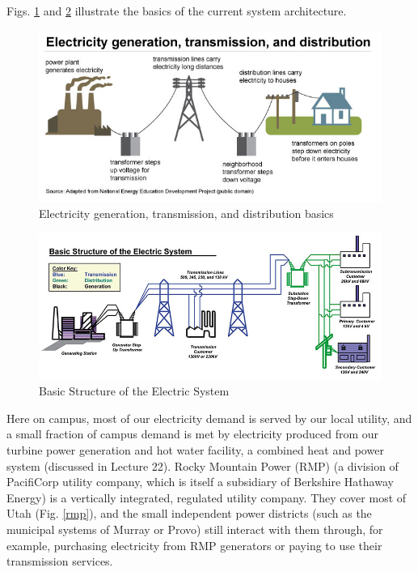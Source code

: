 \documentclass[10pt]{article}
\begin{document}
Figs. \ref{eiaill} and \ref{ucsill} illustrate the basics of the current system architecture.

\medskip
            \begin{figure}[h]
            \centering
            \includegraphics[width=12cm]{extras21/transmission.jpg}
            \caption{Electricity generation, transmission, and distribution basics \cite{howelectricity}}
            \label{eiaill}
            \end{figure}
\bigskip

\medskip
            \begin{figure}[h]
            \centering
            \includegraphics[width=12cm]{extras21/ucsill.jpg}
            \caption{Basic Structure of the Electric System \cite{howtheelectricity}}
            \label{ucsill}
            \end{figure}
\bigskip

Here on campus, most of our electricity demand is served by our local utility, and a small fraction of campus demand is met by electricity produced from our turbine power generation and hot water facility, a combined heat and power system (discussed in Lecture 22). Rocky Mountain Power (RMP) (a division of PacifiCorp utility company, which is itself a subsidiary of Berkshire Hathaway Energy) is a vertically integrated, regulated \cite{noauthor_undated-eo} utility company. %
They cover most of Utah (Fig. \ref{rmp}), and the small independent power districts (such as the municipal systems of Murray or Provo) still interact with them through, for example, purchasing electricity from RMP generators or paying to use their transmission services. 
\end{document}
